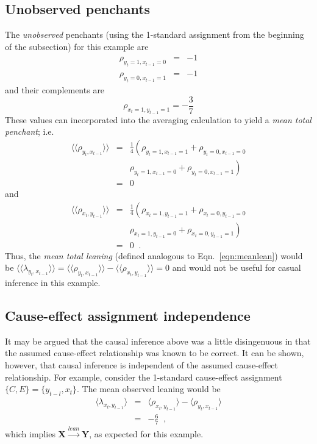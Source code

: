 \documentclass[a4paper,11pt,twocolumn]{article}
\begin{document}
\subsection{Unobserved penchants}
The {\em unobserved} penchants (using the 1-standard assignment from the beginning of the subsection) for this example are
\begin{eqnarray}
\rho_{y_t=1,x_{t-1}=0} &=& -1\\
\rho_{y_t=0,x_{t-1}=1} &=& -1
\end{eqnarray}
and their complements are
\begin{equation}
\rho_{x_t=1,y_{t-1}=1}=-\frac{3}{7}
\end{equation}
These values can incorporated into the averaging calculation to yield a {\em mean total penchant}; i.e.\ 
\begin{eqnarray*}
\langle\langle \rho_{y_t,x_{t-1}} \rangle\rangle &=& \frac{1}{4}\left(\rho_{y_t=1,x_{t-1}=1} + \rho_{y_t=0,x_{t-1}=0}\right.\\
& &\left. \rho_{y_t=1,x_{t-1}=0} + \rho_{y_t=0,x_{t-1}=1}\right) \\
&=& 0
\end{eqnarray*}
and
\begin{eqnarray*}
\langle\langle \rho_{x_t,y_{t-1}} \rangle\rangle &=& \frac{1}{4}\left(\rho_{x_t=1,y_{t-1}=1} + \rho_{x_t=0,y_{t-1}=0}\right.\\
& &\left. \rho_{x_t=1,y_{t-1}=0} + \rho_{x_t=0,y_{t-1}=1}\right)\\
&=& 0\;\;.
\end{eqnarray*}
Thus, the {\em mean total leaning} (defined analogous to Eqn.\ \ref{eqn:meanlean}) would be $\langle\langle \lambda_{y_t,x_{t-1}} \rangle\rangle = \langle\langle \rho_{y_t,x_{t-1}} \rangle\rangle -  \langle\langle \rho_{x_t,y_{t-1}} \rangle\rangle = 0$ and would not be useful for casual inference in this example.

\subsection{Cause-effect assignment independence}
It may be argued that the causal inference above was a little disingenuous in that the assumed cause-effect relationship was known to be correct.  It can be shown, however, that causal inference is independent of the assumed cause-effect relationship.  For example, consider the 1-standard cause-effect assignment $\{C,E\}=\{y_{t-l},x_t\}$. The mean observed leaning would be
\begin{eqnarray}
\langle \lambda_{x_t,y_{t-1}} \rangle &=& \langle \rho_{x_t,y_{t-1}} \rangle - \langle \rho_{y_t,x_{t-1}} \rangle\\
&=& -\frac{6}{7}\;\;,
\end{eqnarray}
which implies $\mathbf{X}\xrightarrow{lean}\mathbf{Y}$, as expected for this example.
\end{document}
